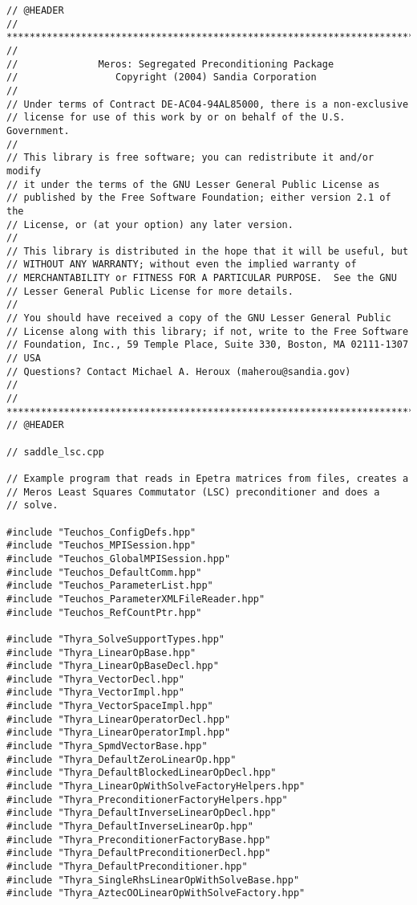 \documentclass[oneeqnum,onefignum,onetabnum,10pt]{SANDreport}
\begin{document}
\begin{verbatim}
// @HEADER
// ***********************************************************************
// 
//              Meros: Segregated Preconditioning Package
//                 Copyright (2004) Sandia Corporation
// 
// Under terms of Contract DE-AC04-94AL85000, there is a non-exclusive
// license for use of this work by or on behalf of the U.S. Government.
// 
// This library is free software; you can redistribute it and/or modify
// it under the terms of the GNU Lesser General Public License as
// published by the Free Software Foundation; either version 2.1 of the
// License, or (at your option) any later version.
//  
// This library is distributed in the hope that it will be useful, but
// WITHOUT ANY WARRANTY; without even the implied warranty of
// MERCHANTABILITY or FITNESS FOR A PARTICULAR PURPOSE.  See the GNU
// Lesser General Public License for more details.
//  
// You should have received a copy of the GNU Lesser General Public
// License along with this library; if not, write to the Free Software
// Foundation, Inc., 59 Temple Place, Suite 330, Boston, MA 02111-1307
// USA
// Questions? Contact Michael A. Heroux (maherou@sandia.gov) 
// 
// ***********************************************************************
// @HEADER

// saddle_lsc.cpp

// Example program that reads in Epetra matrices from files, creates a
// Meros Least Squares Commutator (LSC) preconditioner and does a
// solve.

#include "Teuchos_ConfigDefs.hpp"
#include "Teuchos_MPISession.hpp"
#include "Teuchos_GlobalMPISession.hpp"
#include "Teuchos_DefaultComm.hpp"
#include "Teuchos_ParameterList.hpp"
#include "Teuchos_ParameterXMLFileReader.hpp"
#include "Teuchos_RefCountPtr.hpp"

#include "Thyra_SolveSupportTypes.hpp"
#include "Thyra_LinearOpBase.hpp"
#include "Thyra_LinearOpBaseDecl.hpp"
#include "Thyra_VectorDecl.hpp"
#include "Thyra_VectorImpl.hpp" 
#include "Thyra_VectorSpaceImpl.hpp"
#include "Thyra_LinearOperatorDecl.hpp"
#include "Thyra_LinearOperatorImpl.hpp"
#include "Thyra_SpmdVectorBase.hpp"
#include "Thyra_DefaultZeroLinearOp.hpp"
#include "Thyra_DefaultBlockedLinearOpDecl.hpp"
#include "Thyra_LinearOpWithSolveFactoryHelpers.hpp"
#include "Thyra_PreconditionerFactoryHelpers.hpp"
#include "Thyra_DefaultInverseLinearOpDecl.hpp"
#include "Thyra_DefaultInverseLinearOp.hpp"
#include "Thyra_PreconditionerFactoryBase.hpp"
#include "Thyra_DefaultPreconditionerDecl.hpp"
#include "Thyra_DefaultPreconditioner.hpp"
#include "Thyra_SingleRhsLinearOpWithSolveBase.hpp"
#include "Thyra_AztecOOLinearOpWithSolveFactory.hpp"


\end{verbatim}
\end{document}
